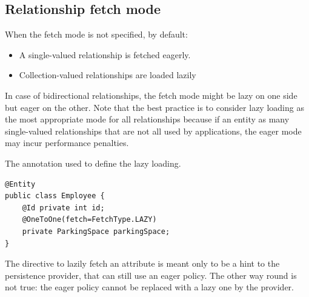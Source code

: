 \documentclass[12pt, a4paper]{report}
\begin{document}
    \subsection{Relationship fetch mode}
    When the fetch mode is not specified, by default:
    \begin{itemize}
        \item A single-valued relationship is fetched eagerly. 
        \item Collection-valued relationships are loaded lazily
    \end{itemize}
    In case of bidirectional relationships, the fetch mode might be lazy on one side but eager on the other. Note that the best practice is to consider lazy loading 
    as the most appropriate mode for all relationships because if an entity as many single-valued relationships that are not all used by applications, the eager mode may 
    incur performance penalties. 
    \begin{example}
        The annotation used to define the lazy loading.
        \begin{lstlisting}[style=Java]
@Entity
public class Employee {
    @Id private int id;
    @OneToOne(fetch=FetchType.LAZY)
    private ParkingSpace parkingSpace;
}
        \end{lstlisting}
    \end{example}
    The directive to lazily fetch an attribute is meant only to be a hint to the persistence provider, that can still use an eager policy. The other way round is not true: 
    the eager policy cannot be replaced with a lazy one by the provider. 
\end{document}
